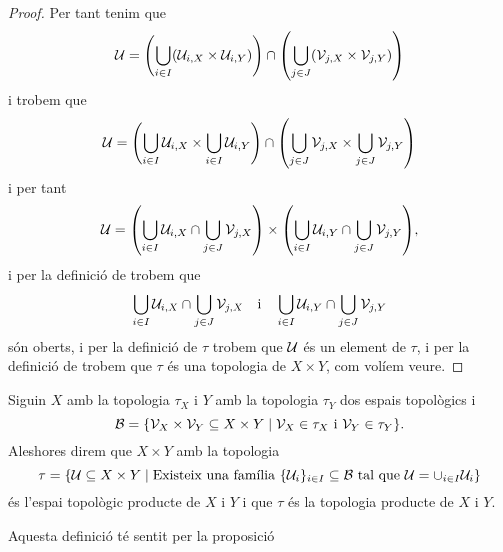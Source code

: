 \documentclass[../../Main.tex]{subfiles}
\begin{document}
\begin{proposition}
\begin{proof}
			Per tant tenim que
			\[
			    \obert{U}=\left(\bigcup_{i\in I}\left(\obert{U}_{i,X}\times\obert{U}_{i,Y}\right)\right)\cap\left(\bigcup_{j\in J}\left(\obert{V}_{j,X}\times\obert{V}_{j,Y}\right)\right)
			\]
			i trobem que
			\[
			    \obert{U}=\left(\bigcup_{i\in I}\obert{U}_{i,X}\times\bigcup_{i\in I}\obert{U}_{i,Y}\right)\cap\left(\bigcup_{j\in J}\obert{V}_{j,X}\times\bigcup_{j\in J}\obert{V}_{j,Y}\right)
			\]
			i per tant
			\[
			    \obert{U}=\left(\bigcup_{i\in I}\obert{U}_{i,X}\cap\bigcup_{j\in J}\obert{V}_{j,X}\right)\times\left(\bigcup_{i\in I}\obert{U}_{i,Y}\cap\bigcup_{j\in J}\obert{V}_{j,Y}\right),
			\]
			i per la definició de  trobem que
			\[
			    \bigcup_{i\in I}\mathcal{U}_{i,X}\cap\bigcup_{j\in J}\mathcal{V}_{j,X}\quad\text{i}\quad\bigcup_{i\in I}\mathcal{U}_{i,Y}\cap\bigcup_{j\in J}\mathcal{V}_{j,Y}
			\]
			són oberts, i per la definició de \(\tau\) trobem que \(\mathcal{U}\) és un element de \(\tau\), i per la definició de  trobem que \(\tau\) és una topologia de \(X\times Y\), com volíem veure.
		\end{proof}
	\end{proposition}
	\begin{definition}
		\label{def:topologia producte}
		Siguin \(X\) amb la topologia \(\tau_{X}\) i \(Y\) amb la topologia \(\tau_{Y}\) dos espais topològics i
		\[
		    \mathcal{B}=\{\mathcal{V}_{X}\times\mathcal{V}_{Y}\subseteq X\times Y\mid\mathcal{V}_{X}\in\tau_{X}\text{ i }\mathcal{V}_{Y}\in\tau_{Y}\}.
		\]
		Aleshores direm que \(X\times Y\) amb la topologia
		\[
		    \tau=\{\mathcal{U}\subseteq X\times Y\mid\text{Existeix una família }\{\mathcal{U}_{i}\}_{i\in I}\subseteq\mathcal{B}\text{ tal que }\mathcal{U}=\cup_{i\in I}\mathcal{U}_{i}\}
		\]
		és l'espai topològic producte de \(X\) i \(Y\) i que \(\tau\) és la topologia producte de \(X\) i \(Y\).
		
		Aquesta definició té sentit per la proposició 
	\end{definition}
\end{document}
